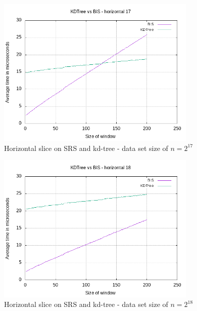 \begin{figure}[h]
    \centering
    \includegraphics[width = 0.85\textwidth]{pictures/analysis/smalls/hori_17.png}
    \caption{Horizontal slice on SRS and kd-tree - data set size of $n=2^{17}$}\label{fig:small_hori_17}
\end{figure}

\begin{figure}[h]
    \centering
    \includegraphics[width = 0.85\textwidth]{pictures/analysis/smalls/hori_18.png}
    \caption{Horizontal slice on SRS and kd-tree - data set size of $n=2^{18}$}\label{fig:small_hori_18}
\end{figure}

